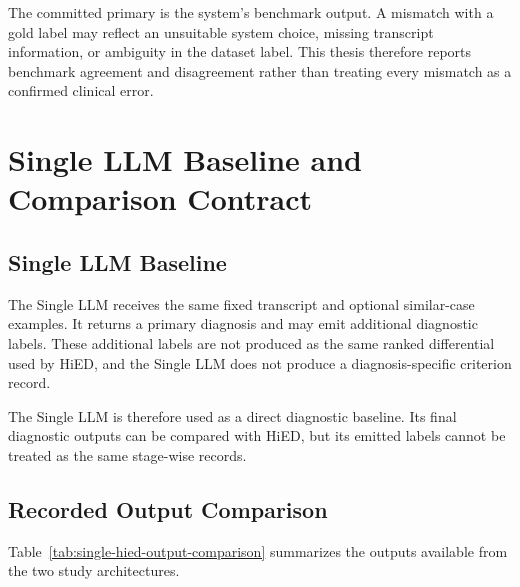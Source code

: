 The committed primary is the system's benchmark output. A mismatch with a gold label may reflect an unsuitable system choice, missing transcript information, or ambiguity in the dataset label. This thesis therefore reports benchmark agreement and disagreement rather than treating every mismatch as a confirmed clinical error.

\section{Single LLM Baseline and Comparison Contract}
\label{sec:compared-architectures}

\subsection{Single LLM Baseline}
\label{sec:single-architecture}

The Single LLM receives the same fixed transcript and optional similar-case examples. It returns a primary diagnosis and may emit additional diagnostic labels. These additional labels are not produced as the same ranked differential used by HiED, and the Single LLM does not produce a diagnosis-specific criterion record.

The Single LLM is therefore used as a direct diagnostic baseline. Its final diagnostic outputs can be compared with HiED, but its emitted labels cannot be treated as the same stage-wise records.

\subsection{Recorded Output Comparison}
\label{sec:recorded-output-differences}

Table~\ref{tab:single-hied-output-comparison} summarizes the outputs available from the two study architectures.

